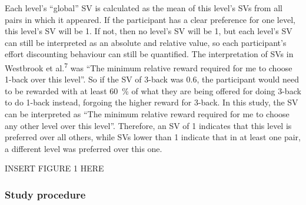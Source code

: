 \documentclass[
  man,floatsintext]{apa6}
\begin{document}
Each level's ``global'' SV is calculated as the mean of this level's SVs from all pairs in which it appeared.
If the participant has a clear preference for one level, this level's SV will be 1.
If not, then no level's SV will be 1, but each level's SV can still be interpreted as an absolute and relative value, so each participant's effort discounting behaviour can still be quantified.
The interpretation of SVs in Westbrook et al.\textsuperscript{7} was ``The minimum relative reward required for me to choose 1-back over this level''.
So if the SV of 3-back was 0.6, the participant would need to be rewarded with at least 60~\% of what they are being offered for doing 3-back to do 1-back instead, forgoing the higher reward for 3-back.
In this study, the SV can be interpreted as ``The minimum relative reward required for me to choose any other level over this level''.
Therefore, an SV of 1 indicates that this level is preferred over all others, while SVs lower than 1 indicate that in at least one pair, a different level was preferred over this one.

INSERT FIGURE 1 HERE

\hypertarget{study-procedure}{%
\subsubsection{Study procedure}\label{study-procedure}}
\end{document}
